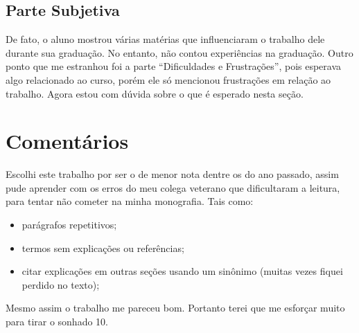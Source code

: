 \documentclass[12pt,a4paper]{article}
\begin{document}
\subsection{Parte Subjetiva}
De fato, o aluno mostrou várias matérias que influenciaram o trabalho dele durante sua graduação. No entanto, não contou experiências na graduação. Outro ponto que me estranhou foi a parte ``Dificuldades e Frustrações'', pois esperava algo relacionado ao curso, porém ele só mencionou frustrações em relação ao trabalho. Agora estou com dúvida sobre o que é esperado nesta seção.

\section{Comentários}
Escolhi este trabalho por ser o de menor nota dentre os do ano passado, assim pude aprender com os erros do meu colega veterano que dificultaram a leitura, para tentar não cometer na minha monografia. Tais como:
\begin{itemize}
\item parágrafos repetitivos;
\item termos sem explicações ou referências;
\item citar explicações em outras seções usando um sinônimo (muitas vezes fiquei perdido no texto);
\end{itemize}
Mesmo assim o trabalho me pareceu bom. Portanto terei que me esforçar muito para tirar o sonhado 10.
\end{document}
